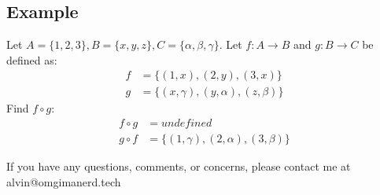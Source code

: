 \documentclass[letterpaper, 12pt]{math}
\begin{document}
\subsection*{Example}
Let \( A = \{1,2,3\}, B = \{x,y,z\}, C = \{\alpha,\beta,\gamma\} \). Let
\( f:A\to B \) and \( g:B\to C \) be defined as:
\begin{align*}
  f &= \{(1,x),(2,y),(3,x)\} \\
  g &= \{(x,\gamma),(y,\alpha),(z,\beta)\}
\end{align*}
Find \( f\circ g \):
\begin{align*}
  f\circ g &= undefined \\
  g\circ f &= \{(1,\gamma),(2,\alpha),(3,\beta)\}
\end{align*}

\begin{center}
  If you have any questions, comments, or concerns, please contact me at
  alvin@omgimanerd.tech
\end{center}
\end{document}
